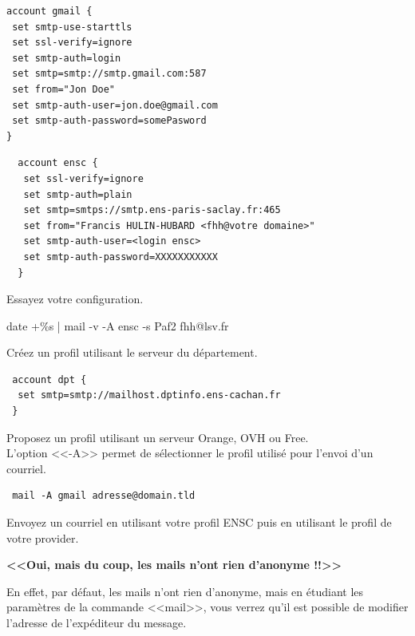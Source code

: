 \documentclass[11pt]{article}
\begin{document}
\begin{lstlisting} 
account gmail { 
 set smtp-use-starttls
 set ssl-verify=ignore
 set smtp-auth=login 
 set smtp=smtp://smtp.gmail.com:587
 set from="Jon Doe"
 set smtp-auth-user=jon.doe@gmail.com
 set smtp-auth-password=somePasword
}
\end{lstlisting}

\begin{solution} 
 \begin{lstlisting}
  account ensc {
   set ssl-verify=ignore
   set smtp-auth=plain
   set smtp=smtps://smtp.ens-paris-saclay.fr:465
   set from="Francis HULIN-HUBARD <fhh@votre domaine>"
   set smtp-auth-user=<login ensc>
   set smtp-auth-password=XXXXXXXXXXX
  }
 \end{lstlisting}
\end{solution}

Essayez votre configuration.

\begin{solution} date +\%s | mail -v -A ensc -s Paf2 fhh@lsv.fr \end{solution}

Créez un profil utilisant le serveur du département.

\begin{solution}
 \begin{lstlisting}
 account dpt {
  set smtp=smtp://mailhost.dptinfo.ens-cachan.fr 
 }
 \end{lstlisting}
\end{solution}

Proposez un profil utilisant un serveur Orange, OVH ou Free.\\

L'option <<-A>> permet de sélectionner le profil utilisé pour l'envoi d'un
courriel. 

\begin{lstlisting}
 mail -A gmail adresse@domain.tld
\end{lstlisting}

Envoyez un courriel en utilisant votre profil ENSC puis en utilisant le profil
de votre provider.\\

\begin{center} \textbf{<<Oui, mais du coup, les mails n'ont rien d'anonyme
!!>>} \end{center}

En effet, par défaut, les mails n'ont rien d'anonyme, mais en étudiant les
paramètres de la commande <<mail>>, vous verrez qu'il est possible de modifier
l'adresse de l'expéditeur du message.\\
\end{document}

